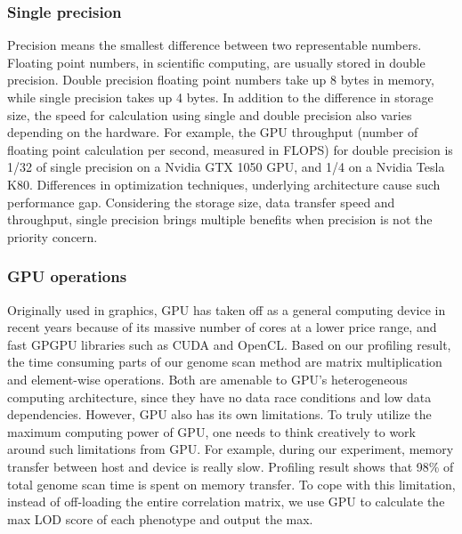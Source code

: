 \documentclass[9pt,twocolumn,twoside,lineno]{gsag3jnl}
\begin{document}
 
\subsubsection{Single precision}
Precision means the smallest difference between two representable numbers.
Floating point numbers, in scientific computing, are usually stored in double precision. 
Double precision floating point numbers take up 8 bytes in memory, while single precision takes up 4 bytes. 
In addition to the difference in storage size, the speed for calculation using single and double precision also varies 
depending on the hardware.  For example, the GPU throughput (number of floating point calculation per second, measured in FLOPS)
for double precision is 1/32 of single precision on a Nvidia GTX 1050 GPU, and 1/4 on a Nvidia Tesla K80. 
Differences in optimization techniques, underlying architecture cause such performance gap. 
Considering the storage size, data transfer speed and throughput, single precision brings multiple benefits when precision is not the priority concern. 


\subsubsection{GPU operations}

Originally used in graphics, GPU has taken off as a general computing device in recent years because of its massive number of cores at a lower price range, and fast GPGPU libraries such as CUDA and OpenCL.
Based on our profiling result, the time consuming parts of our genome scan method are matrix multiplication and element-wise operations. 
Both are amenable to GPU's heterogeneous computing architecture, since they have no data race conditions and low data dependencies. 
However, GPU also has its own limitations. 
To truly utilize the maximum computing power of GPU, one needs to think creatively to work around such limitations from GPU. 
For example, during our experiment, memory transfer between host and device is really slow. 
Profiling result shows that 98\% of total genome scan time is spent on memory transfer. 
To cope with this limitation, instead of off-loading the entire correlation matrix, we use GPU to calculate the max LOD score of each phenotype and output the max. 
\end{document}
